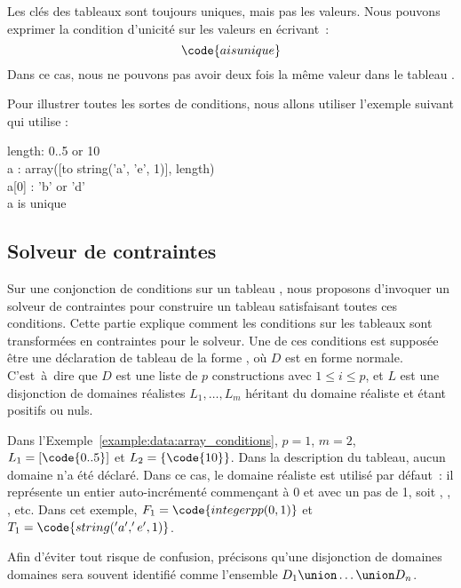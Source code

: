 Les clés des tableaux sont toujours uniques, mais pas les valeurs. Nous pouvons
exprimer la condition d'unicité sur les valeurs en écrivant~:
%
$$\code{a is unique}$$
%
Dans ce cas, nous ne pouvons pas avoir deux fois la même valeur dans le tableau
.

\begin{example}
\label{example:data:array_conditions}
Pour illustrer toutes les sortes de conditions, nous allons utiliser l'exemple
suivant qui utilise :

\begin{pre}
length: 0..5 or 10 \\
a     : array([to string('a', 'e', 1)], length) \\
a[0]  : 'b' or 'd' \\
a is unique
\end{pre}

\end{example}

\subsection{Solveur de contraintes}

Sur une conjonction de conditions sur un tableau , nous proposons
d'invoquer un solveur de contraintes pour construire un tableau satisfaisant
toutes ces conditions. Cette partie explique comment les conditions sur les
tableaux sont transformées en contraintes pour le solveur. Une de ces conditions
est supposée être une déclaration de tableau de la forme , où $D$ est en forme normale. C'est~à~dire que $D$ est une liste de $p$
constructions  avec $1 \leq i \leq p$, et $L$ est une
disjonction de domaines réalistes $L_1, \dots, L_m$ héritant du domaine réaliste
 et étant positifs ou nuls.

Dans l'Exemple~\ref{example:data:array_conditions}, $p = 1$, $m = 2$, $L_1 =
[\code{0..5}]$ et $L_2 = \{\code{10}\}$. Dans la description du tableau, aucun
domaine n'a été déclaré. Dans ce cas, le domaine réaliste 
est utilisé par défaut~: il représente un entier auto-incrémenté commençant à 0
et avec un pas de 1, soit , , ,  etc. Dans cet
exemple, $F_1 = \code{integerpp(0, 1)}$ et $T_1 = \code{string('a', 'e', 1)}$.

Afin d'éviter tout risque de confusion, précisons qu'une disjonction de domaines
domaines  sera souvent identifié comme
l'ensemble $D_1 \union \dots \union D_n$.

